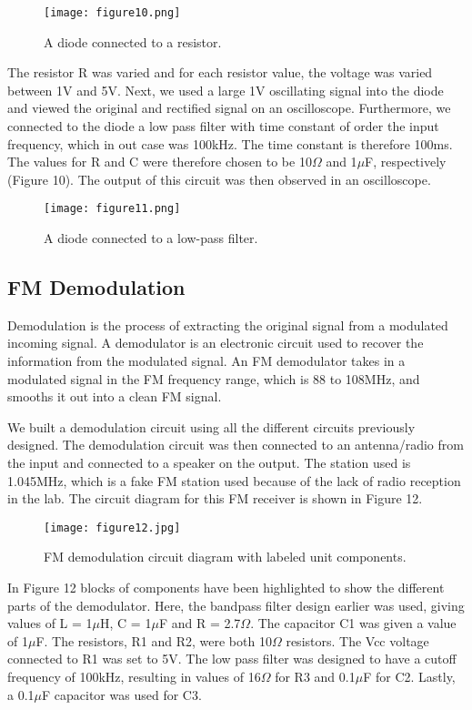 \documentclass[12pt]{article}
\begin{document}
\begin {figure}[!h]
\centering
\texttt{[image: figure10.png]}
\caption{\label{rvd} A diode connected to a resistor.}
\end {figure}

The resistor R was varied and  for each resistor value, the voltage was
varied between 1V and 5V. Next, we used a large 1V oscillating signal
into the diode and viewed the original and rectified signal on an
oscilloscope. Furthermore, we connected to the diode a low pass filter
with time constant of order the input frequency, which in out case was
100kHz. The time constant is therefore 100ms. The values for R and C
were therefore chosen to be 10$\Omega$ and 1$\mu$F, respectively (Figure
10). The output of this circuit was then observed in an oscilloscope.

\begin {figure}[!h]
\centering
\texttt{[image: figure11.png]}
\caption{\label{rvd} A diode connected to a low-pass filter.}
\end {figure}

\subsection {FM Demodulation}
Demodulation is the process of extracting the original signal from a
modulated incoming signal. A demodulator is an electronic circuit used
to recover the information from the modulated signal. An FM demodulator
takes in a modulated signal in the FM frequency range, which is 88 to
108MHz, and smooths it out into a clean FM signal. 

We built a demodulation circuit using all the different circuits
previously designed. The demodulation circuit was then connected to an
antenna/radio from the input and connected to a speaker on the
output. The station used is 1.045MHz,  which is a fake FM station used
because of the lack of radio reception in the lab. The circuit diagram
for this FM receiver is shown in Figure 12.

\begin {figure}[!h]
\centering
\texttt{[image: figure12.jpg]}
\caption{\label{rvd} FM demodulation circuit diagram with labeled
unit components.}
\end {figure}

In Figure 12 blocks of components have been highlighted to show the different
parts of the demodulator. Here, the bandpass filter design earlier was
used, giving values of L = 1$\mu$H, C = 1$\mu$F and R =
2.7$\Omega$. The capacitor C1 was given a value of 1$\mu$F. The
resistors, R1 and R2, were both 10$\Omega$ resistors. The Vcc voltage
connected to R1 was set to 5V. The low pass filter was designed to have
a cutoff frequency of 100kHz, resulting in values of 16$\Omega$ for R3
and 0.1$\mu$F for C2. Lastly, a 0.1$\mu$F capacitor was used for C3.
\end{document}
